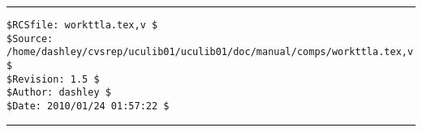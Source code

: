 \vfill

\noindent\begin{minipage}{\textwidth}
\noindent\rule[-0.25in]{\textwidth}{1pt}
\begin{tiny}
\begin{verbatim}
$RCSfile: workttla.tex,v $
$Source: /home/dashley/cvsrep/uculib01/uculib01/doc/manual/comps/workttla.tex,v $
$Revision: 1.5 $
$Author: dashley $
$Date: 2010/01/24 01:57:22 $
\end{verbatim}
\end{tiny}
\noindent\rule[0.25in]{\textwidth}{1pt}
\end{minipage}

%
%
%
%
%
